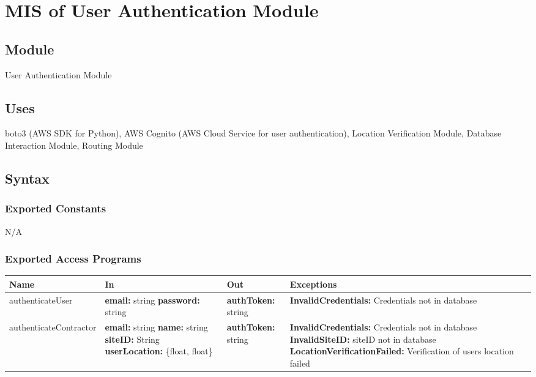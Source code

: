 \documentclass[12pt, titlepage]{article}
\begin{document}
\section{MIS of User Authentication Module} \label{Module}

\subsection{Module}

User Authentication Module

\subsection{Uses}

boto3 (AWS SDK for Python), AWS Cognito (AWS Cloud Service for user
authentication), Location Verification Module, Database Interaction
Module, Routing Module

\subsection{Syntax}

\subsubsection{Exported Constants}

N/A

\subsubsection{Exported Access Programs}

\begin{center}
  \begin{tabular}{>{\raggedright}p{4cm} >{\raggedright}p{3cm}
    >{\raggedright}p{4cm} p{4cm}}
    \hline
    \textbf{Name} & \textbf{In} & \textbf{Out} & \textbf{Exceptions} \\
    \hline
    authenticateUser & \textbf{email:} string \newline
    \textbf{password:} string & \textbf{authToken:} string &
    \textbf{InvalidCredentials:} Credentials not in database \\
    \hline
    authenticateContractor & \textbf{email:} string \newline
    \textbf{name:} string \newline \textbf{siteID:} String \newline
    \textbf{userLocation:} \{float, float\} &
    \textbf{authToken:} string & \textbf{InvalidCredentials:}
    Credentials not in database \newline
    \textbf{InvalidSiteID:}
    siteID not in database \newline
    \textbf{LocationVerificationFailed:} Verification of users
    location failed \\
    \hline
  \end{tabular}
\end{center}
\end{document}
